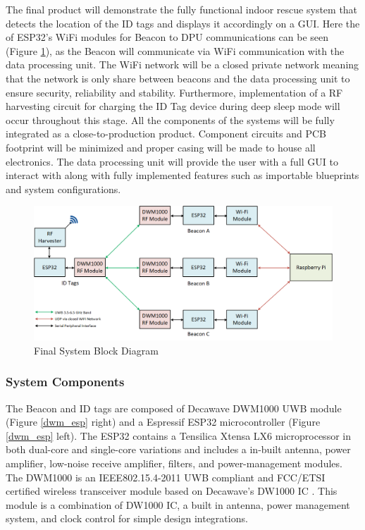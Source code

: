 The final product will demonstrate the fully functional indoor rescue system that detects the location of the ID tags and displays it accordingly on a GUI. Here the of ESP32’s WiFi modules for Beacon to DPU communications can be seen (Figure \ref{final}), as the Beacon will communicate via WiFi communication with the data processing unit. The WiFi network will be a closed private network meaning that the network is only share between beacons and the data processing unit to ensure security, reliability and stability. Furthermore, implementation of a RF harvesting circuit for charging the ID Tag device during deep sleep mode will occur throughout this stage. All the components of the systems will be fully integrated as a close-to-production product. Component circuits and {PCB} footprint will be minimized and proper casing will be made to house all electronics. The data processing unit will provide the user with a full GUI to interact with along with fully implemented features such as importable blueprints and system configurations.

\bigskip
\begin{figure}[H]
\centering
    \includegraphics[width=\linewidth]{./images/03_final.png}
    \caption{Final System Block Diagram}
    \label{final}
\end{figure}

\pagebreak
\subsubsection{System Components}
\medskip
The Beacon and ID tags are composed of Decawave DWM1000 \Gls{UWB} module (Figure \ref{dwm_esp} right) and a Espressif ESP32 microcontroller (Figure \ref{dwm_esp} left). The ESP32 contains a Tensilica Xtensa LX6 microprocessor in both dual-core and single-core variations and includes a in-built antenna, power amplifier, low-noise receive amplifier, filters, and power-management modules. The DWM1000 is an IEEE802.15.4-2011 UWB compliant and \Gls{FCC}/\Gls{ETSI} certified wireless transceiver module based on Decawave’s DW1000 IC \cite{R4-2-1}. This module is a combination of DW1000 IC, a built in antenna, power management system, and clock control for simple design integrations. 

